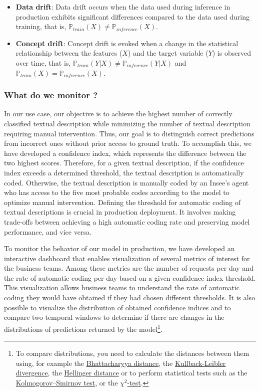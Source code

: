 \begin{itemize}
    \item \textbf{Data drift}: Data drift occurs when the data used during inference in production exhibits significant differences compared to the data used during training, that is,  $\mathds{P}_{train}(X) \neq \mathds{P}_{inference}(X)$.
    \item \textbf{Concept drift}: Concept drift is evoked when a change in the statistical relationship between the features ($X$) and the target variable ($Y$) is observed over time, that is, $\mathds{P}_{train}(Y|X) \neq \mathds{P}_{inference}(Y|X)$ and $\mathds{P}_{train}(X) = \mathds{P}_{inference}(X)$.
\end{itemize}


\subsubsection{What do we monitor ?}

In our use case, our objective is to achieve the highest number of correctly classified textual description while minimizing the number of textual description requiring manual intervention. Thus, our goal is to distinguish correct predictions from incorrect ones without prior access to ground truth. To accomplish this, we have developed a confidence index, which represents the difference between the two highest scores. Therefore, for a given textual description, if the confidence index exceeds a determined threshold, the textual description is automatically coded. Otherwise, the textual description is manually coded by an Insee's agent who has access to the five most probable codes according to the model to optimize manual intervention. Defining the threshold for automatic coding of textual descriptions is crucial in production deployment. It involves making trade-offs between achieving a high automatic coding rate and preserving model performance, and vice versa.

To monitor the behavior of our model in production, we have developed an interactive dashboard that enables visualization of several metrics of interest for the business teams. Among these metrics are the number of requests per day and the rate of automatic coding per day based on a given confidence index threshold. This visualization allows business teams to understand the rate of automatic coding they would have obtained if they had chosen different thresholds. It is also possible to visualize the distribution of obtained confidence indices and to compare two temporal windows to determine if there are changes in the distributions of predictions returned by the model\footnote{To compare distributions, you need to calculate the distances between them using, for example the \href{https://en.wikipedia.org/wiki/Bhattacharyya_distance}{Bhattacharyya distance}, the \href{https://en.wikipedia.org/wiki/Kullback\%E2\%80\%93Leibler_divergence}{Kullback-Leibler divergence}, the \href{https://en.wikipedia.org/wiki/Hellinger_distance}{Hellinger distance} or to perform statistical tests such as the \href{https://en.wikipedia.org/wiki/Kolmogorov\%E2\%80\%93Smirnov_test}{Kolmogorov–Smirnov test}, or the \href{https://en.wikipedia.org/wiki/Chi-squared_test}{$\chi^2$-test}.}. 

